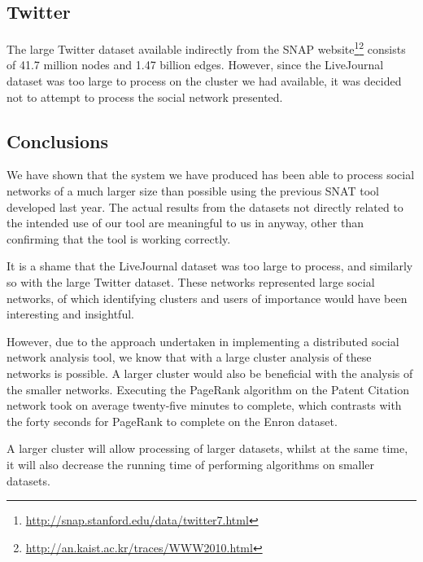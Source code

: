 \subsection{Twitter}
The large Twitter dataset available indirectly from the SNAP website\footnote{\url{http://snap.stanford.edu/data/twitter7.html}}\footnote{\url{http://an.kaist.ac.kr/traces/WWW2010.html}} consists of 41.7 million nodes and 1.47 billion edges. However, since the LiveJournal dataset was too large to process on the cluster we had available, it was decided not to attempt to process the social network presented.

\subsection{Conclusions}
We have shown that the system we have produced has been able to process social
networks of a much larger size than possible using the previous SNAT tool
developed last year. The actual results from the datasets not directly related
to the intended use of our tool are meaningful to us in anyway, other than
confirming that the tool is working correctly.

It is a shame that the LiveJournal dataset was too large to process, and
similarly so with the large Twitter dataset. These networks represented large
social networks, of which identifying clusters and users of importance would
have been interesting and insightful.

However, due to the approach undertaken in implementing a distributed social
network analysis tool, we know that with a large cluster analysis of these
networks is possible. A larger cluster would also be beneficial with the
analysis of the smaller networks. Executing the PageRank algorithm on the
Patent Citation network took on average twenty-five minutes to complete, which
contrasts with the forty seconds for PageRank to complete on the Enron dataset.

A larger cluster will allow processing of larger datasets, whilst at the same
time, it will also decrease the running time of performing algorithms on
smaller datasets.